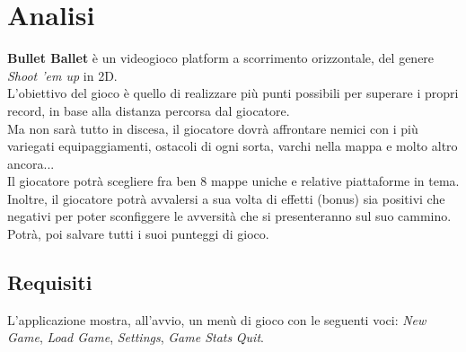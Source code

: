 
\chapter{Analisi}

\textsf{\small \textbf{Bullet Ballet} è un videogioco platform a scorrimento orizzontale, del genere \emph{Shoot 'em up} in 2D.}\\
\textsf{\small L'obiettivo del gioco è quello di realizzare più punti possibili per superare i propri record, in base alla distanza percorsa dal giocatore.}\\

\textsf{\small Ma non sarà tutto in discesa, il giocatore dovrà affrontare nemici con i più variegati equipaggiamenti, ostacoli di ogni sorta, varchi nella mappa e molto altro ancora...}\\
\textsf{\small Il giocatore potrà scegliere fra ben 8 mappe uniche e relative piattaforme in tema.}\\

\textsf{\small Inoltre, il giocatore potrà avvalersi a sua volta di effetti (bonus) sia positivi che negativi per poter sconfiggere le avversità che si presenteranno sul suo cammino.}\\

\textsf{\small Potrà, poi salvare tutti i suoi punteggi di gioco.}\\

\section{Requisiti}

\textsf{\small L'applicazione mostra, all'avvio, un menù di gioco con le seguenti voci: \emph{New Game}, \emph{Load Game}, \emph{Settings}, \emph{Game Stats} \emph{Quit}.}\\

